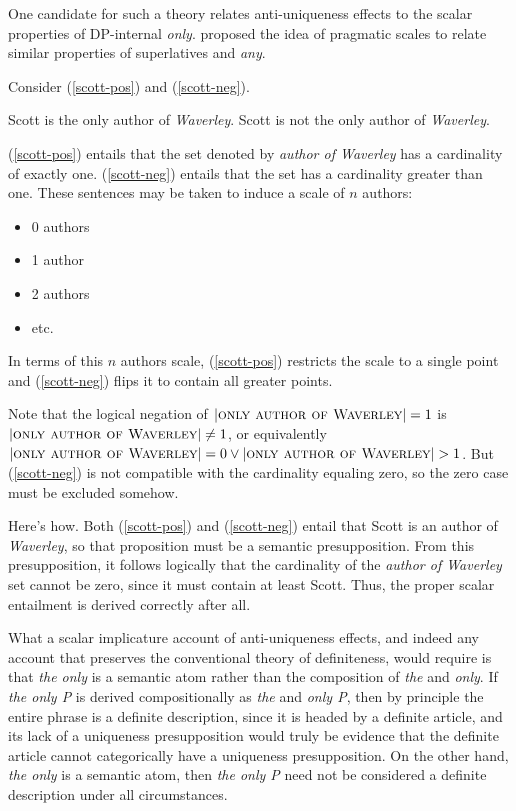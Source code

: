 \documentclass{article}
\begin{document}
One candidate for such a theory relates anti-uniqueness effects to the scalar properties of DP-internal \textit{only}. \citet{fauconnier75} proposed the idea of pragmatic scales to relate similar properties of superlatives and \textit{any}.


Consider (\ref{scott-pos}) and (\ref{scott-neg}).

\begin{exe}
	\ex \label{scott-pos} Scott is the only author of \textit{Waverley}.
	\ex \label{scott-neg} Scott is not the only author of \textit{Waverley}.
\end{exe}

(\ref{scott-pos}) entails that the set denoted by \textit{author of Waverley} has a cardinality of exactly one. (\ref{scott-neg}) entails that the set has a cardinality greater than one. These sentences may be taken to induce a scale of $n$ authors:

\begin{itemize}
	\item 0 authors
	\item 1 author
	\item 2 authors
	\item etc.
\end{itemize}


In terms of this $n$ authors scale, (\ref{scott-pos}) restricts the scale to a single point and (\ref{scott-neg}) flips it to contain all greater points.

Note that the logical negation of $|\textsc{only author of Waverley}| = 1$ is
$|\textsc{only author of Waverley}| \ne 1$, or equivalently $|\textsc{only author of Waverley}| = 0 \lor |\textsc{only author of Waverley}| > 1$. But (\ref{scott-neg}) is not compatible with the cardinality equaling zero, so the zero case must be excluded somehow.

Here's how. Both (\ref{scott-pos}) and (\ref{scott-neg}) entail that Scott is an author of \textit{Waverley}, so that proposition must be a semantic presupposition. From this presupposition, it follows logically that the cardinality of the \textit{author of Waverley} set cannot be zero, since it must contain at least Scott. Thus, the proper scalar entailment is derived correctly after all.

What a scalar implicature account of anti-uniqueness effects, and indeed any account that preserves the conventional theory of definiteness, would require is that \textit{the only} is a semantic atom rather than the composition of \textit{the} and \textit{only}. If \textit{the only P} is derived compositionally as \textit{the} and \textit{only P}, then by principle the entire phrase is a definite description, since it is headed by a definite article, and its lack of a uniqueness presupposition would truly be evidence that the definite article cannot categorically have a uniqueness presupposition. On the other hand, \textit{the only} is a semantic atom, then \textit{the only P} need not be considered a definite description under all circumstances.
\end{document}
